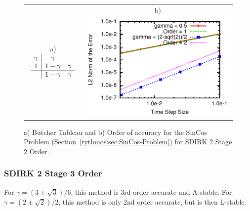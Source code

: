 \begin{figure}[H]
\centering{}%
\begin{tabular}{cc}
a) $\begin{array}{c|cc}
\gamma & \gamma\\
1 & 1-\gamma & \gamma\\
\hline  & 1-\gamma & \gamma
\end{array}$ & b)\includegraphics[scale=1.5]{figures/SDIRK_2Stage2Order}\tabularnewline
\end{tabular}\caption{a) Butcher Tableau and b) Order of accuracy for the SinCos Problem
(Section~\ref{rythmos:sec:SinCos-Problem}) for SDIRK 2 Stage 2 Order.}
\end{figure}



\subsubsection{SDIRK 2 Stage 3 Order}

For $\gamma=(3\pm\sqrt{3})/6$, this method is 3rd order accurate
and A-stable. For $\gamma=(2\pm\sqrt{2})/2$, this method is only
2nd order accurate, but is then L-stable.

